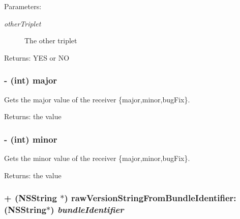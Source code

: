 \begin{Desc}
\item[Parameters:]
\begin{description}
\item[{\em otherTriplet}]The other triplet \end{description}
\end{Desc}
\begin{Desc}
\item[Returns:]YES or NO \end{Desc}
\hypertarget{interface_s_s_y_version_triplet_dfc6e27ff1718983120aec644064b3f7}{
\subsubsection[{major}]{\setlength{\rightskip}{0pt plus 5cm}- (int) major }}
\label{interface_s_s_y_version_triplet_dfc6e27ff1718983120aec644064b3f7}


Gets the major value of the receiver \{major,minor,bugFix\}. 

\begin{Desc}
\item[Returns:]the value \end{Desc}
\hypertarget{interface_s_s_y_version_triplet_24cfe844258de7623aa2d977e3569aa6}{
\subsubsection[{minor}]{\setlength{\rightskip}{0pt plus 5cm}- (int) minor }}
\label{interface_s_s_y_version_triplet_24cfe844258de7623aa2d977e3569aa6}


Gets the minor value of the receiver \{major,minor,bugFix\}. 

\begin{Desc}
\item[Returns:]the value \end{Desc}
\hypertarget{interface_s_s_y_version_triplet_6e29a80e862a92cb2844f2031c873539}{
\subsubsection[{rawVersionStringFromBundleIdentifier:}]{\setlength{\rightskip}{0pt plus 5cm}+ (NSString $\ast$) rawVersionStringFromBundleIdentifier: (NSString$\ast$) {\em bundleIdentifier}}}
\label{interface_s_s_y_version_triplet_6e29a80e862a92cb2844f2031c873539}


